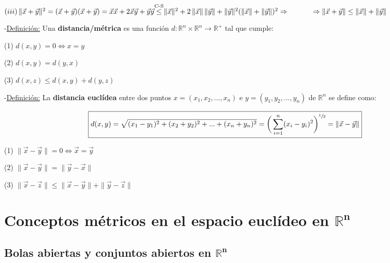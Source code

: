 \documentclass[10pt, titlepage]{article}
\newcommand{\leqc}[1]{\stackrel{\mathclap{\normalfont\mbox{\scriptsize{#1}}}}{\leq}}
\newcommand{\dindent}{\indent\indent}
\begin{document}
\dindent $(iii) \, \|\vec{x} + \vec{y}\|^2 = (\vec{x} + \vec{y})(\vec{x} + \vec{y}) = \vec{x} \vec{x} + 2 
\vec{x} \vec{y} + \vec{y} \vec{y} \leqc{C-S} \|\vec{x}\|^2 + 2 \, \|\vec{x}\| \, \|\vec{y}\| + \|\vec{y}\|^2 
(\|\vec{x}\| + \|\vec{y}\|)^2 \Rightarrow \\ \dindent \Rightarrow \|\vec{x} + \vec{y}\| \leq \|\vec{x}\| + 
\|\vec{y}\|$ 
\vspace{7mm}

\noindent-\underline{Definición:} Una \textbf{distancia/métrica} es una función $d:\mathbb{R}^n \times \mathbb{R}^n \rightarrow \mathbb{R}^+$ tal que cumple: \vspace{3mm}

(1) $ d(x, y) = 0 \iff x=y$ \vspace{3mm}

(2) $ d(x, y) = d(y, x)$ \vspace{3mm}

(3) $d(x, z) \leq d(x, y) + d(y, z)$
\vspace{7mm}

\noindent-\underline{Definición:} La \textbf{distancia euclídea} entre dos puntos $x = (x_1, x_2,..., x_n)$ e 
$y = (y_1, y_2,..., y_n)$ de $\mathbb{R}^n$ se define como:

\[
\boxed{
d(x, y) = \sqrt{(x_1-y_1)^2+(x_2+y_2)^2+...+(x_n+y_n)^2}=\bigg{(} \sum_{i=1}^n (x_i - y_i)^2 \bigg{)} 
^{\sfrac{1}{2}} = \|\vec{x} - \vec{y}\|
}
\]
\vspace{3mm}

(1) $\|\vec{x} - \vec{y}\| = 0 \iff \vec{x} = \vec{y}$
\vspace{3mm}

(2) $\|\vec{x} - \vec{y}\| = \|\vec{y} - \vec{x}\|$
\vspace{3mm}

(3) $\|\vec{x} - \vec{z}\| \leq \|\vec{x} - \vec{y}\| + \|\vec{y} - \vec{z}\|$
\vspace{5mm}


\section{Conceptos métricos en el espacio euclídeo en $\mathbb{R}^{\mathbf{n}}$}
\vspace{3mm}


\subsection{Bolas abiertas y conjuntos abiertos en $\mathbb{R}^{\mathbf{n}}$}
\vspace{3mm}
\end{document}
